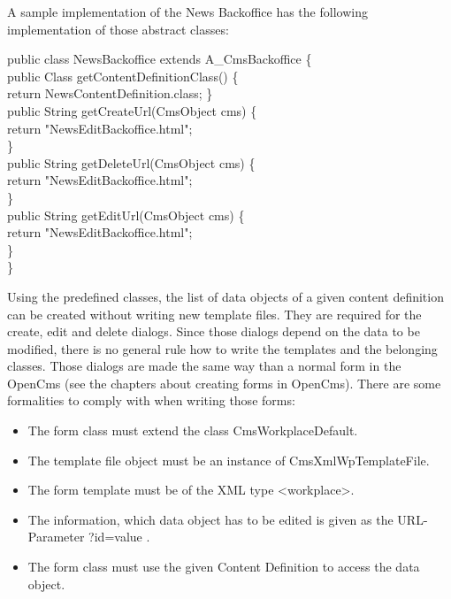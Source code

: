 A sample implementation of the News Backoffice has the following
implementation of those abstract classes:

\begin{java}
public class NewsBackoffice extends A\_CmsBackoffice \{\\
\jtaba        public Class getContentDefinitionClass() \{\\
\jtabb                  return NewsContentDefinition.class;
\jtaba        \}\\
\jtaba        public String getCreateUrl(CmsObject cms) \{\\
\jtabb                return "NewsEditBackoffice.html";\\
\jtaba        \}\\
\jtaba        public String getDeleteUrl(CmsObject cms) \{\\
\jtabb                return "NewsEditBackoffice.html";\\
\jtaba        \}\\
\jtaba        public String getEditUrl(CmsObject cms) \{\\
\jtabb                return "NewsEditBackoffice.html";\\
\jtaba        \}\\
\}\\
\end{java}

Using the predefined classes, the list of data objects of a given
content definition can be created without writing new template files.
They are required for the create, edit and delete dialogs. Since those
dialogs depend on the data to be modified, there is no general rule how
to write the templates and the belonging classes. Those dialogs are made
the same way than a normal form in the OpenCms (see the chapters about
creating forms in OpenCms). There are some formalities to comply with
when writing those forms:
\begin{itemize}
\item The form class must extend the class CmsWorkplaceDefault.
\item The template file object must be an instance of
CmsXmlWpTemplateFile.
\item The form template must be of the XML type <workplace>.
\item The information, which data object has to be edited is given as
the URL-Parameter ?id=value .
\item The form class must use the given Content Definition to access
the data object.
\end{itemize}

